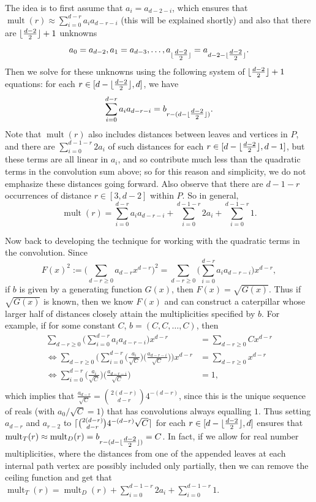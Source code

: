 \documentclass[12]{article}
\DeclarePairedDelimiter\ceil{\lceil}{\rceil}
\DeclarePairedDelimiter\floor{\lfloor}{\rfloor}
\DeclareMathOperator{\mult}{mult}
\theoremstyle{definition}
\begin{document}
		The idea is to first assume that $a_i = a_{d-2-i}$, which ensures that $\mult(r) \approx \sum_{i=0}^{d-r} a_ia_{d-r-i}$ (this will be explained shortly) and also that there are $\floor{\tfrac{d-2}{2}}+1$ unknowns 
		$$a_0=a_{d-2}, a_1 =a_{d-3}, \ldots, a_{\floor{\tfrac{d-2}{2}}} = a_{d-2-\floor{\tfrac{d-2}{2}}}.$$    Then we solve for these unknowns using the following system of $\floor{\tfrac{d-2}{2}}+1$ equations: for each $r \in [d-\floor{\tfrac{d-2}{2}}, d]$, we have
		\begin{align}\label{Equations}
			\sum_{i=0}^{d-r} a_ia_{d-r-i} = b_{r-(d-\floor{\tfrac{d-2}{2}})}.
		\end{align}
		Note that $\mult(r)$ also includes distances between leaves and vertices in $P$, and there are $\sum_{i=0}^{d-1-r}2a_i$ of such  distances for each $r \in [d-\floor{\tfrac{d-2}{2}}, d-1]$, but these terms are all linear in $a_i$, and so contribute much less than the quadratic terms in the convolution sum above; so for this reason and simplicity, we do not emphasize these distances going forward.  Also observe that there are $d-1-r$ occurrences of distance $r \in [3, d-2]$ within $P$.  So in general,
		$$\mult(r) = \sum_{i=0}^{d-r} a_ia_{d-r-i} + \sum_{i=0}^{d-1-r}2a_i + \sum_{i=0}^{d-1-r}1.$$
		
		Now back to developing the technique for working with the quadratic terms in the convolution.  Since 
		$$F(x)^2 := \biggr(\sum_{d-r \geq 0} a_{d-r}x^{d-r} \biggr)^2 = \sum_{d-r \geq 0} \biggr(\sum_{i=0}^{d-r} a_ia_{d-r-i}\biggr)x^{d-r},$$ 
		if $b$ is given by a generating function $G(x)$, then $F(x) = \sqrt{G(x)}$. Thus if $\sqrt{G(x)}$ is known, then we know $F(x)$ and can construct a caterpillar whose larger half of distances closely attain the multiplicities specified by $b$.  For example, if for some constant $C$, $b = (C, C, \ldots, C)$, then 
		\begin{align*}
			\sum_{d-r \geq 0} \biggr(\sum_{i=0}^{d-r} a_ia_{d-r-i}\biggr)x^{d-r} &= \sum_{d-r \geq 0} Cx^{d-r}	\\
			\Leftrightarrow \sum_{d-r \geq 0} \biggr(\sum_{i=0}^{d-r} \big(\frac{a_i}{\sqrt{C}}\big)\big(\frac{a_{d-r-i}}{\sqrt{C}}\big)\biggr)x^{d-r} &= \sum_{d-r \geq 0} x^{d-r}	\\
			\Leftrightarrow \sum_{i=0}^{d-r} \big(\frac{a_i}{\sqrt{C}}\big)\big(\frac{a_{d-r-i}}{\sqrt{C}}\big) &= 1,	\\
		\end{align*}
		which implies that $\frac{a_{d-r}}{\sqrt{C}} = {2(d-r) \choose d-r} 4^{-(d-r)} $, since this is the unique sequence of reals (with $a_0/\sqrt{C} = 1$) that has convolutions always equalling $1$.  Thus setting $a_{d-r}$ and $a_{r-2}$ to $\ceil{{2(d-r) \choose d-r} 4^{-(d-r)}\sqrt{C}}$ for each $r \in [d-\floor{\tfrac{d-2}{2}}, d]$ ensures that $\mult_T(r) \approx \mult_D(r) = b_{r-(d-\floor{\tfrac{d-2}{2}})} = C$.  In fact, if we allow for real number multiplicities, where the distances from one of the appended leaves at each internal path vertex are possibly included only partially, then we can remove the ceiling function and get that $\mult_T(r) = \mult_D(r) + \sum_{i=0}^{d-1-r}2a_i + \sum_{i=0}^{d-1-r}1$.
		
\end{document}
